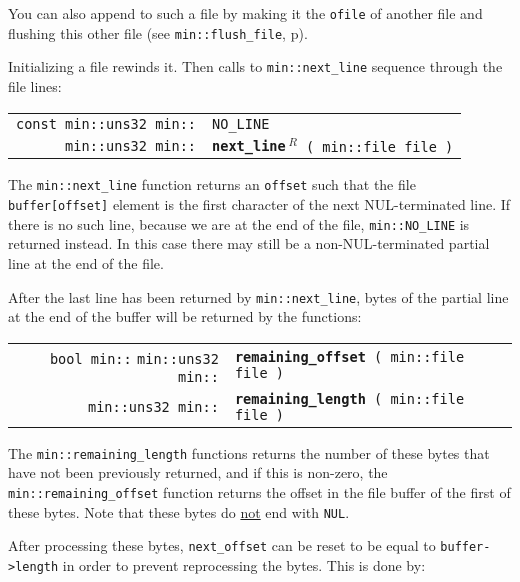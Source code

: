 \documentclass[12pt]{article}
\makeatletter
\newcommand{\ttindex}[1]{\index{#1@{\tt #1}}}
\newcommand{\minindex}[1]{\ttindex{min::#1}\ttindex{#1}}
\newcommand{\pagref}[1]{p\pageref{#1}}
\newcommand{\EOL}{\penalty \exhyphenpenalty}
\newenvironment{indpar}[1][0.3in]%
	{\begin{list}{}%
		     {\setlength{\itemsep}{0in}%
		      \setlength{\topsep}{0in}%
		      \setlength{\parsep}{1ex}%
		      \setlength{\labelwidth}{#1}%
		      \setlength{\leftmargin}{#1}%
		      \addtolength{\leftmargin}{\labelsep}}%
	 \item}%
	{\end{list}}
\newcommand{\LABEL}[1]{\label{#1}}
\newcommand{\MINKEY}[1]{{\tt \bf #1}\minindex{#1}}
\newcommand{\MINNBKEY}[1]{{\tt #1}\minindex{#1}}
\newcommand{\REL}{$\,^R$}
\makeatother
\begin{document}
You can also append to such a file by making it the {\tt ofile}
of another file and flushing this other file
(see {\tt min::\EOL flush\_\EOL file}, \pagref{MIN::FLUSH_FILE}).

Initializing a file rewinds it.  Then calls to
{\tt min::\EOL next\_\EOL line} sequence through the file
lines:

\begin{indpar}[1em]\begin{tabular}{r@{}l}
\verb|const min::uns32 min::| & \MINNBKEY{NO\_LINE}
\LABEL{MIN::NO_LINE} \\
\verb|min::uns32 min::|
    & \MINKEY{next\_line\REL}\verb| ( min::file file )|
\LABEL{MIN::NEXT_LINE_OF_FILE} \\
\end{tabular}\end{indpar}

The {\tt min::\EOL next\_\EOL line} function returns an
{\tt offset} such that the file {\tt buffer[offset]} element
is the first character of the next NUL-terminated line.
If there is no such line, because we are at the end of the file,
{\tt min::\EOL NO\_\EOL LINE} is returned instead.  In this case
there may still be a non-NUL-terminated partial line at the end
of the file.

After the last line has been returned by
{\tt min::\EOL next\_\EOL line}, bytes of the partial line at the
end of the buffer will be returned by the functions:

\begin{indpar}[1em]\begin{tabular}{r@{}l}
\verb|bool min::|
\verb|min::uns32 min::|
    & \MINKEY{remaining\_\EOL offset}\verb| ( min::file file )|
\LABEL{MIN::REMAINING} \\
\verb|min::uns32 min::|
    & \MINKEY{remaining\_\EOL length}\verb| ( min::file file )|
\LABEL{MIN::REMAINING_LENGTH} \\
\end{tabular}\end{indpar}

The {\tt min::\EOL remaining\_\EOL length}
functions returns the number of these bytes that have not
been previously returned, and if this is non-zero,
the {\tt min::\EOL remaining\_\EOL offset} function returns
the offset in the file buffer of the first of these bytes.
Note that these bytes do \underline{not} end with {\tt NUL}.

After processing these bytes, {\tt next\_\EOL offset}
can be reset to be equal to {\tt buffer->\EOL length} in order to
prevent reprocessing the bytes.
This is done by:
\end{document}
